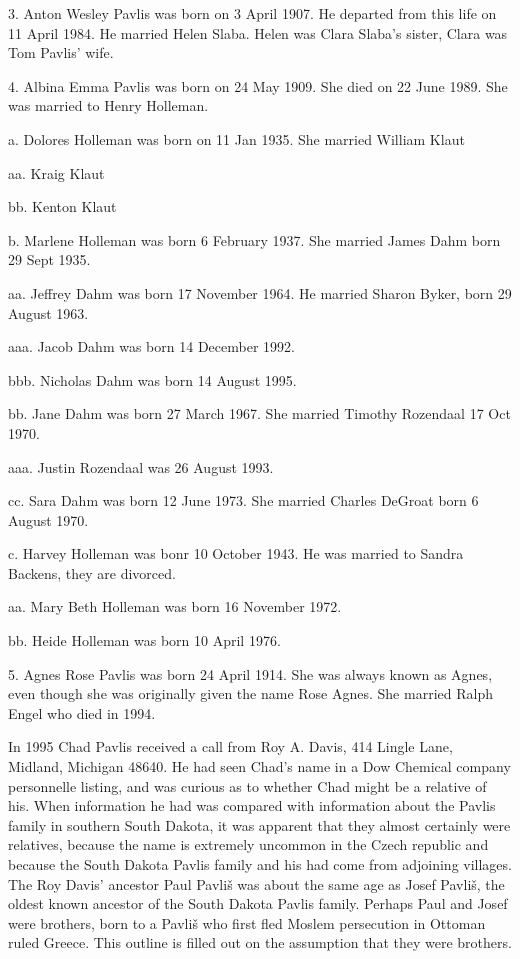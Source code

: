 \documentclass[a4paper]{article}
\begin{document}
3. Anton Wesley Pavlis was born on 3 April 1907.  He departed from this life on 11 April 1984.  He married Helen Slaba. Helen was Clara Slaba's sister, Clara was Tom Pavlis' wife. 

4. Albina Emma Pavlis was born on 24 May 1909.  She died on 22 June 1989. She was married to Henry Holleman.

a. Dolores Holleman was born on 11 Jan 1935.  She married William Klaut

aa. Kraig Klaut

bb. Kenton Klaut

b. Marlene Holleman was born 6 February 1937.  She married James Dahm born 29 Sept 1935.

aa. Jeffrey Dahm was born 17 November 1964. He married Sharon Byker, born 29 August 1963.

aaa. Jacob Dahm was born 14 December 1992.

bbb. Nicholas Dahm was born 14 August 1995.

bb. Jane Dahm was born 27 March 1967.  She married Timothy Rozendaal 17 Oct 1970. 

aaa. Justin Rozendaal was 26 August 1993.

cc. Sara Dahm was born 12 June 1973.  She married Charles DeGroat born 6 August 1970.

c. Harvey Holleman was bonr 10 October 1943.  He was married to Sandra Backens, they are divorced.

aa. Mary Beth Holleman was born 16 November 1972.

bb. Heide Holleman was born 10 April 1976.

5. Agnes Rose Pavlis was born 24 April 1914.  She was always known as Agnes, even though she was originally given the name Rose Agnes.  She married Ralph Engel who died in 1994.

	In 1995 Chad Pavlis received a call from Roy A. Davis, 414 Lingle Lane, Midland, Michigan 48640.  He had seen Chad's name in a Dow Chemical company personnelle listing, and was curious as to whether Chad might be a relative of his.  When information he had was compared with information about the Pavlis family in southern South Dakota, it was apparent that they almost certainly were relatives, because the name is extremely uncommon in the Czech republic and because the South Dakota Pavlis family and his had come from adjoining villages.  
	The  Roy Davis' ancestor Paul Pavli\v{s} was about the same age as Josef Pavli\v{s}, the oldest known ancestor of the South Dakota Pavlis family.   Perhaps Paul and Josef were brothers, born to a Pavli\v{s} who first fled Moslem persecution in Ottoman ruled Greece.  This outline is filled out on the  assumption that they were brothers. 
\end{document}
